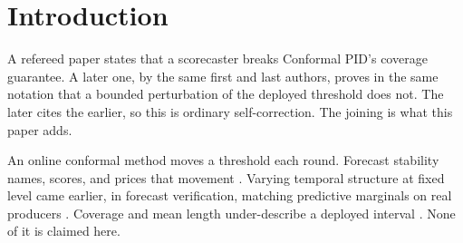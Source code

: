 \section{Introduction}
\label{sec:intro}

A refereed paper states that a scorecaster breaks Conformal PID's coverage guarantee. A later
one, by the same first and last authors, proves in the same notation that a bounded
perturbation of the deployed threshold does not. The later cites the earlier, so this is ordinary
self-correction. The joining is what this paper adds.

An online conformal method \citep{angelopoulos2021gentle} moves a threshold each round. Forecast
stability names, scores, and prices that movement
\citep{tunc2013nervousness,godahewa2025stability,vanbelle2023deepstability,%
pritularga2024congruence,genov2026switching,vanbelle2026stabilizing}. Varying temporal structure at
fixed level came earlier, in forecast verification, matching predictive marginals on real producers
\citep{gneiting2007calibration,pinson2012scenarios,worsnop2018scenarios}. Coverage and mean length
under-describe a deployed interval \citep{min2026questioning,vaze2026simultaneous}. None of it is
claimed here.

